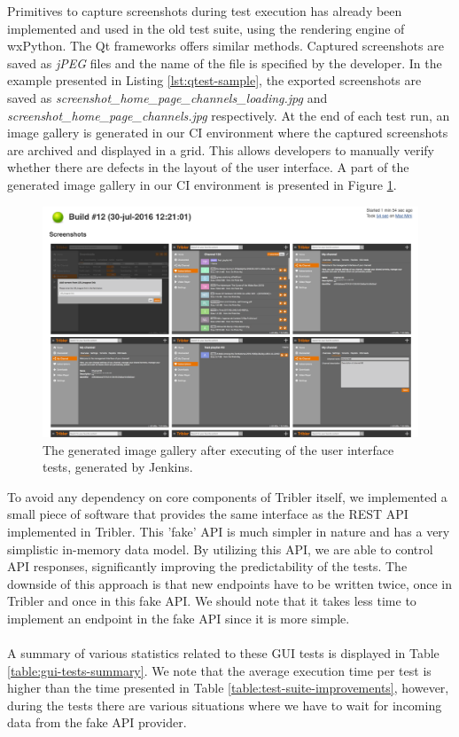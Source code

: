 Primitives to capture screenshots during test execution has already been implemented and used in the old test suite, using the rendering engine of wxPython. The Qt frameworks offers similar methods. Captured screenshots are saved as \emph{jPEG} files and the name of the file is specified by the developer. In the example presented in Listing \ref{lst:qtest-sample}, the exported screenshots are saved as \emph{screenshot\_home\_page\_channels\_loading.jpg} and \emph{screenshot\_home\_page\_channels.jpg} respectively. At the end of each test run, an image gallery is generated in our CI environment where the captured screenshots are archived and displayed in a grid. This allows developers to manually verify whether there are defects in the layout of the user interface. A part of the generated image gallery in our CI environment is presented in Figure \ref{fig:jenkins-gallery}.\\

\begin{figure}[h!]
	\centering
	\includegraphics[width=1.0\columnwidth]{images/improving_qa/gallery_jenkins}
	\caption{The generated image gallery after executing of the user interface tests, generated by Jenkins.}
	\label{fig:jenkins-gallery}
\end{figure}

To avoid any dependency on core components of Tribler itself, we implemented a small piece of software that provides the same interface as the REST API implemented in Tribler. This 'fake' API is much simpler in nature and has a very simplistic in-memory data model. By utilizing this API, we are able to control API responses, significantly improving the predictability of the tests. The downside of this approach is that new endpoints have to be written twice, once in Tribler and once in this fake API. We should note that it takes less time to implement an endpoint in the fake API since it is more simple.\\\\
A summary of various statistics related to these GUI tests is displayed in Table \ref{table:gui-tests-summary}. We note that the average execution time per test is higher than the time presented in Table \ref{table:test-suite-improvements}, however, during the tests there are various situations where we have to wait for incoming data from the fake API provider.

